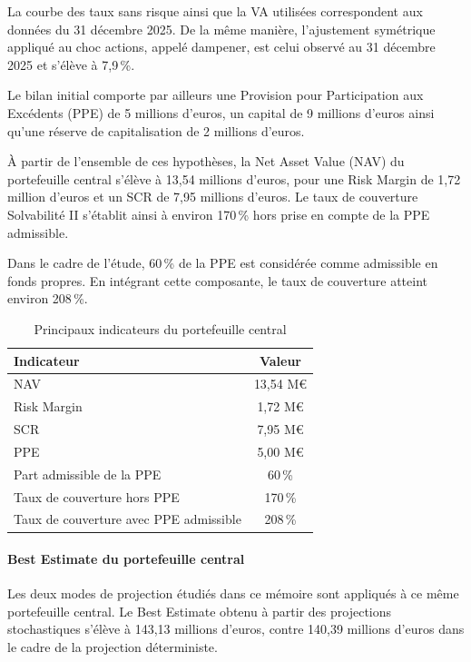 La courbe des taux sans risque ainsi que la VA utilisées correspondent aux données du 31 décembre 2025. De la même manière, l'ajustement symétrique appliqué au choc actions, appelé dampener, est celui observé au 31 décembre 2025 et s'élève à 7,9\,\%.

Le bilan initial comporte par ailleurs une Provision pour Participation aux Excédents (PPE) de 5 millions d'euros, un capital de 9 millions d'euros ainsi qu'une réserve de capitalisation de 2 millions d'euros.

À partir de l'ensemble de ces hypothèses, la Net Asset Value (NAV) du portefeuille central s'élève à 13,54 millions d'euros, pour une Risk Margin de 1,72 million d'euros et un SCR de 7,95 millions d'euros. Le taux de couverture Solvabilité II s'établit ainsi à environ 170\,\% hors prise en compte de la PPE admissible.

Dans le cadre de l'étude, 60\,\% de la PPE est considérée comme admissible en fonds propres. En intégrant cette composante, le taux de couverture atteint environ 208\,\%.

\begin{table}[H]
    \centering
    \caption{Principaux indicateurs du portefeuille central}
    \label{tab:indicateurs_central}
    \begin{tabular}{lc}
        \hline
        \textbf{Indicateur} & \textbf{Valeur} \\
        \hline
        NAV & 13,54 M\euro \\
        Risk Margin & 1,72 M\euro \\
        SCR & 7,95 M\euro \\
        PPE & 5,00 M\euro \\
        Part admissible de la PPE & 60\,\% \\
        Taux de couverture hors PPE & 170\,\% \\
        Taux de couverture avec PPE admissible & 208\,\% \\
        \hline
    \end{tabular}
\end{table}


\paragraph{Best Estimate du portefeuille central}

Les deux modes de projection étudiés dans ce mémoire sont appliqués à ce même portefeuille central. Le Best Estimate obtenu à partir des projections stochastiques s'élève à 143,13 millions d'euros, contre 140,39 millions d'euros dans le cadre de la projection déterministe.

